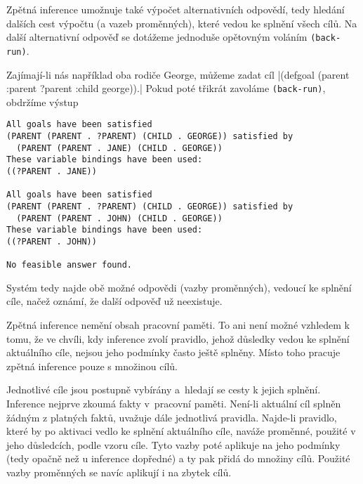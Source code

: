 Zpětná inference umožnuje také výpočet alternativních odpovědí, tedy hledání dalších
cest výpočtu (a vazeb proměnných), které vedou ke splnění všech cílů. Na další
alternativní odpověď se dotážeme jednoduše opětovným voláním \verb|(back-run)|.

Zajímají-li nás například oba rodiče George, můžeme zadat cíl
\cl|(defgoal (parent :parent ?parent :child george)).|
Pokud poté třikrát zavoláme \verb|(back-run)|, obdržíme výstup
\begin{verbatim}
All goals have been satisfied
(PARENT (PARENT . ?PARENT) (CHILD . GEORGE)) satisfied by
  (PARENT (PARENT . JANE) (CHILD . GEORGE))
These variable bindings have been used:
((?PARENT . JANE))

All goals have been satisfied
(PARENT (PARENT . ?PARENT) (CHILD . GEORGE)) satisfied by
  (PARENT (PARENT . JOHN) (CHILD . GEORGE))
These variable bindings have been used:
((?PARENT . JOHN))

No feasible answer found.
\end{verbatim}
Systém tedy najde obě možné odpovědi (vazby proměnných), vedoucí ke splnění
cíle, načež oznámí, že další odpověď už neexistuje.

Zpětná inference nemění obsah pracovní paměti. To ani není možné vzhledem
k tomu, že ve chvíli, kdy inference zvolí pravidlo, jehož důsledky vedou ke
splnění aktuálního cíle, nejsou jeho podmínky často ještě splněny. Místo toho
pracuje zpětná inference pouze s množinou cílů.

Jednotlivé cíle jsou postupně vybírány a~hledají se cesty k jejich splnění.
Inference nejprve zkoumá fakty v~pracovní paměti. Není-li aktuální cíl splněn
žádným z platných faktů, uvažuje dále jednotlivá pravidla. Najde-li pravidlo,
které by po aktivaci vedlo ke splnění aktuálního cíle, naváže proměnné, použité
v jeho důsledcích, podle vzoru cíle. Tyto vazby poté aplikuje na jeho podmínky
(tedy opačně než u inference dopředné) a ty pak přidá do množiny cílů. Použité
vazby proměnných se navíc aplikují i na zbytek cílů.

